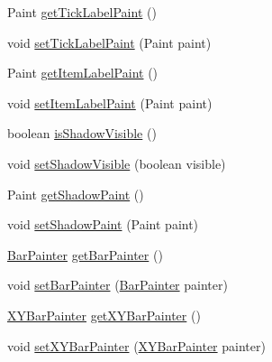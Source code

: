 \begin{DoxyCompactItemize}
\item 
Paint \mbox{\hyperlink{classorg_1_1jfree_1_1chart_1_1_standard_chart_theme_a03ff424d91a3eb843b595f599089197c}{get\+Tick\+Label\+Paint}} ()
\item 
void \mbox{\hyperlink{classorg_1_1jfree_1_1chart_1_1_standard_chart_theme_a374d333d9b261f619420273d8ca062f3}{set\+Tick\+Label\+Paint}} (Paint paint)
\item 
Paint \mbox{\hyperlink{classorg_1_1jfree_1_1chart_1_1_standard_chart_theme_ad04edff5df5b061f66f748a20be6a4fe}{get\+Item\+Label\+Paint}} ()
\item 
void \mbox{\hyperlink{classorg_1_1jfree_1_1chart_1_1_standard_chart_theme_a9eacac654f7481bcc9265b81b419f1fb}{set\+Item\+Label\+Paint}} (Paint paint)
\item 
boolean \mbox{\hyperlink{classorg_1_1jfree_1_1chart_1_1_standard_chart_theme_a4abce207e347a70e28c6aa7fe3780fe0}{is\+Shadow\+Visible}} ()
\item 
void \mbox{\hyperlink{classorg_1_1jfree_1_1chart_1_1_standard_chart_theme_a86c2f156c48f6891fac93f6241a6d8ff}{set\+Shadow\+Visible}} (boolean visible)
\item 
Paint \mbox{\hyperlink{classorg_1_1jfree_1_1chart_1_1_standard_chart_theme_a7401d8e8d0bfe305ff4297a047ccff3b}{get\+Shadow\+Paint}} ()
\item 
void \mbox{\hyperlink{classorg_1_1jfree_1_1chart_1_1_standard_chart_theme_a0ff8611c67fdb30d2cc36ab4d568b6f5}{set\+Shadow\+Paint}} (Paint paint)
\item 
\mbox{\hyperlink{interfaceorg_1_1jfree_1_1chart_1_1renderer_1_1category_1_1_bar_painter}{Bar\+Painter}} \mbox{\hyperlink{classorg_1_1jfree_1_1chart_1_1_standard_chart_theme_a46efbe98dbf20d45f5ec7c27e8b4b03e}{get\+Bar\+Painter}} ()
\item 
void \mbox{\hyperlink{classorg_1_1jfree_1_1chart_1_1_standard_chart_theme_afba641eafa062852fef81ca19fd04cfe}{set\+Bar\+Painter}} (\mbox{\hyperlink{interfaceorg_1_1jfree_1_1chart_1_1renderer_1_1category_1_1_bar_painter}{Bar\+Painter}} painter)
\item 
\mbox{\hyperlink{interfaceorg_1_1jfree_1_1chart_1_1renderer_1_1xy_1_1_x_y_bar_painter}{X\+Y\+Bar\+Painter}} \mbox{\hyperlink{classorg_1_1jfree_1_1chart_1_1_standard_chart_theme_ab9ded4fbaa81ef9ca7b492015c0a8dc6}{get\+X\+Y\+Bar\+Painter}} ()
\item 
void \mbox{\hyperlink{classorg_1_1jfree_1_1chart_1_1_standard_chart_theme_ae553e9cbfe91c5d6bd54b4c03ca01a35}{set\+X\+Y\+Bar\+Painter}} (\mbox{\hyperlink{interfaceorg_1_1jfree_1_1chart_1_1renderer_1_1xy_1_1_x_y_bar_painter}{X\+Y\+Bar\+Painter}} painter)

\end{DoxyCompactItemize}
